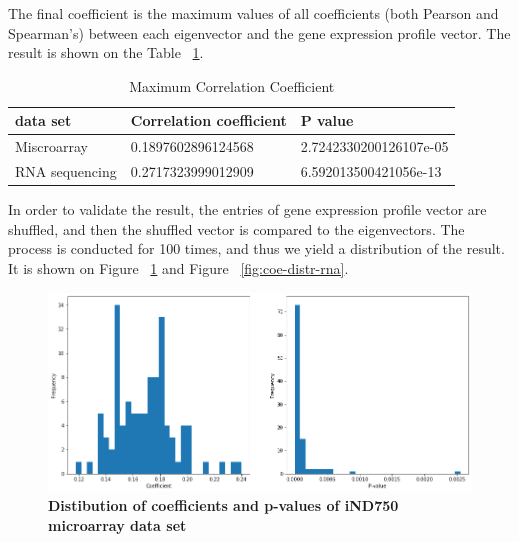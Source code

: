 \documentclass{article} %
\begin{document}
The final coefficient is the maximum values of all coefficients (both Pearson and Spearman's) between each eigenvector and the gene expression profile vector. The result is shown on the Table ~\ref{table:coeff}.

\begin{table}[h!]
\centering
\begin{tabular}{ |p{4cm}||p{4cm}|p{4cm}| }
 \hline
 data set & Correlation coefficient & P value \\
 \hline
 Miscroarray   & 0.1897602896124568 & 2.7242330200126107e-05\\
 RNA sequencing & 0.2717323999012909 & 6.592013500421056e-13\\
 \hline
\end{tabular}
\caption{Maximum Correlation Coefficient}
\label{table:coeff}
\end{table}

In order to validate the result, the entries of gene expression profile vector are shuffled, and then the shuffled vector is compared to the eigenvectors. The process is conducted for 100 times, and thus we yield a distribution of the result. It is shown on Figure ~\ref{fig:coe-distr-micros} and Figure ~\ref{fig:coe-distr-rna}.

\begin{figure}[H]
      \graphicspath{ {images/} }
      \begin{center}
            \includegraphics[scale=0.4]{images/coe-distr-microa.png}
      \end{center}
      \caption{\textbf{Distibution of coefficients and p-values of iND750 microarray data set}}
      \label{fig:coe-distr-micros}
\end{figure}
\end{document}
